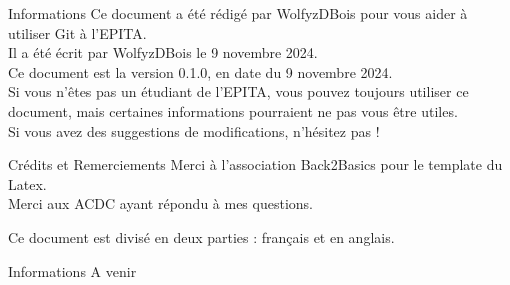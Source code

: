\begin{theorem}[orange]{Informations}
    Ce document a été rédigé par WolfyzDBois pour vous aider à utiliser Git à l'EPITA. \\
    Il a été écrit par WolfyzDBois le 9 novembre 2024. \\
    Ce document est la version 0.1.0, en date du 9 novembre 2024. \\
    Si vous n'êtes pas un étudiant de l'EPITA, vous pouvez toujours utiliser ce document, mais certaines informations pourraient ne pas vous être utiles. \\
    Si vous avez des suggestions de modifications, n'hésitez pas ! \\
    
\end{theorem}

\begin{theorem}[green]{Crédits et Remerciements}
    Merci à l'association Back2Basics pour le template du Latex. \\
    Merci aux ACDC ayant répondu à mes questions. \\
\end{theorem}

\noindent Ce document est divisé en deux parties : français et en anglais. 

\begin{theorem}[orange]{Informations}
    A venir
\end{theorem}